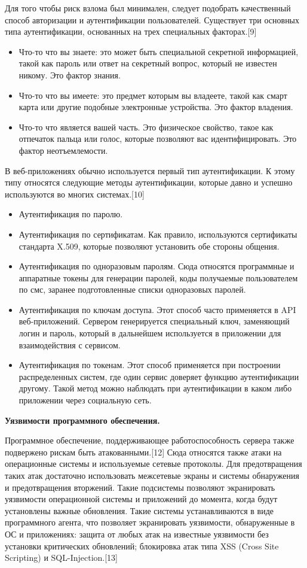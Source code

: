 Для того чтобы риск взлома был минимален, следует подобрать качественный способ авторизации и аутентификации пользователей. Существует три основных типа аутентификации, основанных на трех специальных факторах.[9]

\begin{itemize}
	\item Что-то что вы знаете: это может быть специальной секретной информацией, такой как пароль или ответ на секретный вопрос, который не известен никому. Это фактор знания.
	\item Что-то что вы имеете: это предмет которым вы владеете, такой как смарт карта или другие подобные электронные устройства. Это фактор владения.
	\item Что-то что является вашей часть. Это физическое свойство, такое как отпечаток пальца или голос, которые позволяют вас идентифицировать. Это фактор неотъемлемости.
\end{itemize}

В веб-приложениях обычно используется первый тип аутентификации. К этому типу относятся следующие методы аутентификации, которые давно и успешно используются во многих системах.[10]

\begin{itemize}
	\item Аутентификация по паролю.
	\item Аутентификация по сертификатам. Как правило, используются сертификаты стандарта X.509, которые позволяют установить обе стороны общения.
	\item Аутентификация по одноразовым паролям. Сюда относятся программные и аппаратные токены для генерации паролей, коды получаемые пользователем по смс, заранее подготовленные списки одноразовых паролей.
	\item Аутентификация по ключам доступа. Этот способ часто применяется в API веб-приложений. Сервером генерируется специальный ключ, заменяющий логин и пароль, который в дальнейшем используется в приложении для взаимодействия с сервисом.
	\item Аутентификация по токенам. Этот способ применяется при построении распределенных систем, где один сервис доверяет функцию аутентификации другому. Такой метод можно наблюдать при аутентификации в каком либо приложении через социальную сеть.
\end{itemize}

\textbf{Уязвимости программного обеспечения.}

Программное обеспечение, поддерживающее работоспособность сервера также подвержено рискам быть атакованными.[12] Сюда относятся также атаки на операционные системы и используемые сетевые протоколы. Для предотвращения таких атак достаточно использовать межсетевые экраны и системы обнаружения и предотвращения вторжений. Такие подсистемы позволяют экранировать уязвимости операционной системы и приложений до момента, когда будут установлены важные обновления. Такие системы устанавливаются в виде программного агента, что позволяет экранировать уязвимости, обнаруженные в ОС и приложениях: защита от любых атак на известные уязвимости без установки критических обновлений; блокировка атак типа XSS (Cross Site Scripting) и SQL-Injection.[13]

